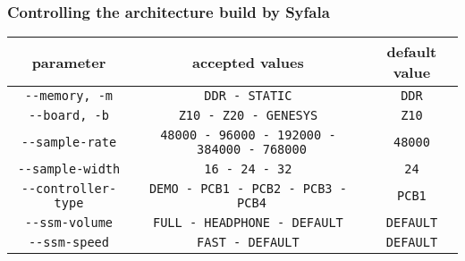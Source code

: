 \subsubsection{Controlling the architecture build by Syfala}

\begin{tabular}{|c|c|c|}
  \toprule
parameter & accepted values & default value \\
\midrule
\texttt{-\/-memory,\ -m} & \texttt{DDR\ -\ STATIC} & \texttt{DDR} \\
\texttt{-\/-board,\ -b} & \texttt{Z10\ -\ Z20\ -\ GENESYS} &
\texttt{Z10} \\
\texttt{-\/-sample-rate} &
\texttt{48000\ -\ 96000\ -\ 192000\ -\ 384000\ -\ 768000} &
\texttt{48000} \\
\texttt{-\/-sample-width} & \texttt{16\ -\ 24\ -\ 32} & \texttt{24} \\
\texttt{-\/-controller-type} &
\texttt{DEMO\ -\ PCB1\ -\ PCB2\ -\ PCB3\ -\ PCB4} & \texttt{PCB1} \\
\texttt{-\/-ssm-volume} & \texttt{FULL\ -\ HEADPHONE\ -\ DEFAULT} &
\texttt{DEFAULT} \\
\texttt{-\/-ssm-speed} & \texttt{FAST\ -\ DEFAULT} & \texttt{DEFAULT} \\
\bottomrule
\end{tabular}
\\


